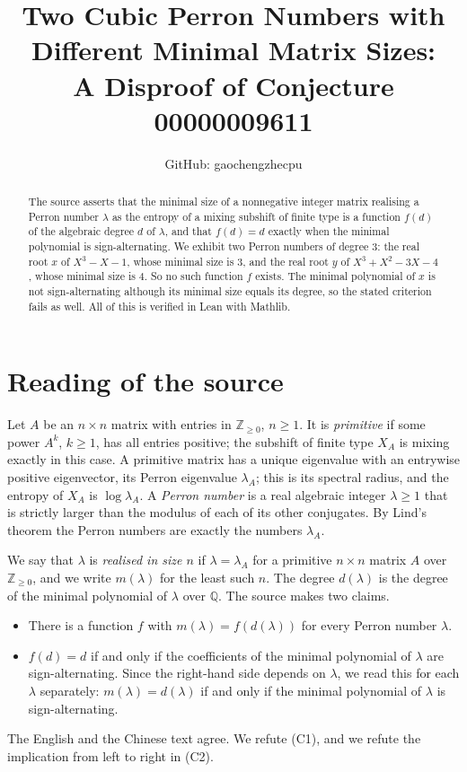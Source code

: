 \documentclass[11pt]{article}
\title{Two Cubic Perron Numbers with Different Minimal Matrix Sizes:\\
A Disproof of Conjecture 00000009611}
\author{GitHub: gaochengzhecpu}
\date{}
\theoremstyle{remark}
\begin{document}
\maketitle
\begin{abstract}
The source asserts that the minimal size of a nonnegative integer matrix
realising a Perron number $\lambda$ as the entropy of a mixing subshift
of finite type is a function $f(d)$ of the algebraic degree $d$ of
$\lambda$, and that $f(d)=d$ exactly when the minimal polynomial is
sign-alternating. We exhibit two Perron numbers of degree $3$: the real
root $x$ of $X^3-X-1$, whose minimal size is $3$, and the real root $y$
of $X^3+X^2-3X-4$, whose minimal size is $4$. So no such function $f$
exists. The minimal polynomial of $x$ is not sign-alternating although
its minimal size equals its degree, so the stated criterion fails as
well. All of this is verified in Lean with Mathlib.
\end{abstract}

\section*{Reading of the source}
Let $A$ be an $n\times n$ matrix with entries in $\mathbb{Z}_{\ge 0}$,
$n\ge 1$. It is \emph{primitive} if some power $A^k$, $k\ge 1$, has all
entries positive; the subshift of finite type $X_A$ is mixing exactly
in this case. A primitive matrix has a unique eigenvalue with an
entrywise positive eigenvector, its Perron eigenvalue $\lambda_A$; this
is its spectral radius, and the entropy of $X_A$ is $\log\lambda_A$.
A \emph{Perron number} is a real algebraic integer $\lambda\ge 1$ that
is strictly larger than the modulus of each of its other conjugates.
By Lind's theorem the Perron numbers are exactly the numbers
$\lambda_A$.

We say that $\lambda$ is \emph{realised in size $n$} if
$\lambda=\lambda_A$ for a primitive $n\times n$ matrix $A$ over
$\mathbb{Z}_{\ge 0}$, and we write $m(\lambda)$ for the least such $n$.
The degree $d(\lambda)$ is the degree of the minimal polynomial of
$\lambda$ over $\mathbb{Q}$. The source makes two claims.
\begin{itemize}
\item[(C1)] There is a function $f$ with $m(\lambda)=f(d(\lambda))$ for
every Perron number $\lambda$.
\item[(C2)] $f(d)=d$ if and only if the coefficients of the minimal
polynomial of $\lambda$ are sign-alternating. Since the right-hand side
depends on $\lambda$, we read this for each $\lambda$ separately:
$m(\lambda)=d(\lambda)$ if and only if the minimal polynomial of
$\lambda$ is sign-alternating.
\end{itemize}
The English and the Chinese text agree. We refute (C1), and we refute
the implication from left to right in (C2).
\end{document}
